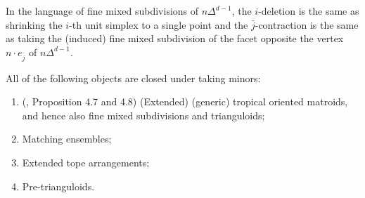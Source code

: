 \documentclass[letterpaper,reqno,11pt]{amsart}
\begin{document}
\begin{remark}
    In the language of fine mixed subdivisions of $n\Delta^{d-1}$, the $i$-deletion is the same as shrinking the $i$-th unit simplex to a single point and the $\bar{j}$-contraction is the same as taking the (induced) fine mixed subdivision of the facet opposite the vertex $n\cdot e_{\bar{j}}$ of $n\Delta^{d-1}$.
\end{remark}

\begin{proposition} All of the following objects are closed under taking minors: 
    \begin{enumerate}
        \item[(a)] \textnormal{(\cite{TropicalOM}, Proposition 4.7 and 4.8)} (Extended) (generic) tropical oriented matroids, and hence also fine mixed subdivisions and trianguloids;
        \item[(b)] Matching ensembles;
        \item[(c)] Extended tope arrangements;
        \item[(d)] Pre-trianguloids.
    \end{enumerate}
\end{proposition}
\end{document}

